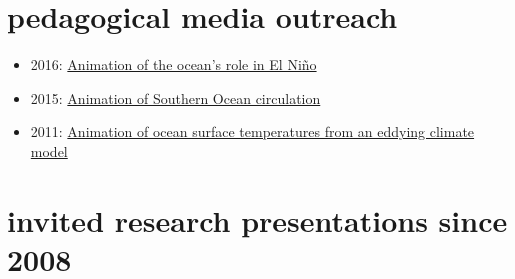 \documentclass{article}
\begin{document}
\section*{\sc  \color{Maroon} pedagogical media outreach}
\vspace{-.3cm}

\begin{itemize}[leftmargin=*]

\item 2016: \href{https://www.youtube.com/watch?v=gaFjlZxM7S4&feature=youtu.be}{Animation of  the ocean's role in El Ni\~{n}o} 

\item 2015:  \href{https://www.youtube.com/watch?v=8VMSF28J9H4&list=PL9poquLHLLO91iC_6pujn6bsMCvMyJ3xU}{Animation  of  Southern Ocean circulation} 

\item 2011:  \href{https://vimeo.com/27076776}{Animation  of  ocean surface temperatures from an eddying climate model} 

\end{itemize}



\section*{\sc \color{Maroon} invited research presentations since 2008}
\vspace{-.3cm}
\end{document}

